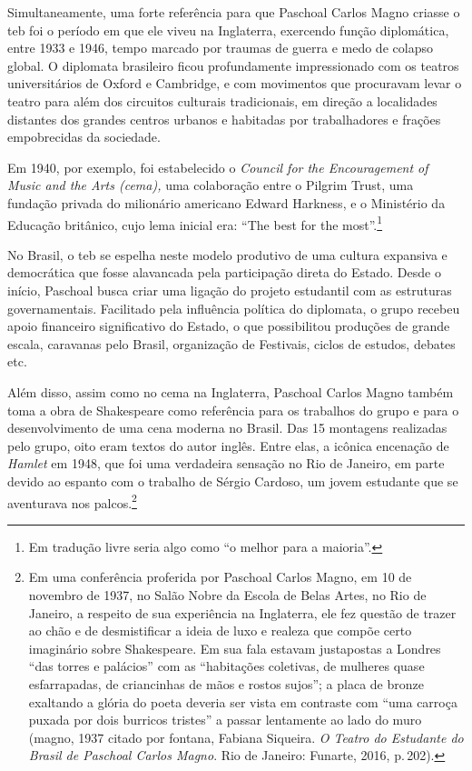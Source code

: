 Simultaneamente, uma forte referência para que Paschoal Carlos Magno
criasse o {\sc teb} foi o período em que ele viveu na Inglaterra, exercendo
função diplomática, entre 1933 e 1946, tempo marcado por traumas de
guerra e medo de colapso global. O diplomata brasileiro ficou
profundamente impressionado com os teatros universitários de Oxford e
Cambridge, e com movimentos que procuravam levar o teatro para além dos
circuitos culturais tradicionais, em direção a localidades distantes dos
grandes centros urbanos e habitadas por trabalhadores e frações
empobrecidas da sociedade.

Em 1940, por exemplo, foi estabelecido o {\it Council for the
Encouragement of Music and the Arts ({\sc cema}),} uma colaboração entre o
Pilgrim Trust, uma fundação privada do milionário americano Edward
Harkness, e o Ministério da Educação britânico, cujo lema inicial era:
“The best for the most”.\footnote{Em tradução livre seria algo como “o
  melhor para a maioria”.}

No Brasil, o {\sc teb} se espelha neste modelo produtivo de uma cultura
expansiva e democrática que fosse alavancada pela participação direta do
Estado. Desde o início, Paschoal busca criar uma ligação do projeto
estudantil com as estruturas governamentais. Facilitado pela influência
política do diplomata, o grupo recebeu apoio financeiro significativo do
Estado, o que possibilitou produções de grande escala, caravanas pelo
Brasil, organização de Festivais, ciclos de estudos, debates etc.

Além disso, assim como no {\sc cema} na Inglaterra, Paschoal Carlos Magno
também toma a obra de Shakespeare como referência para os trabalhos do
grupo e para o desenvolvimento de uma cena moderna no Brasil. Das 15
montagens realizadas pelo grupo, oito eram textos do autor inglês. Entre
elas, a icônica encenação de {\it Hamlet} em 1948, que foi uma
verdadeira sensação no Rio de Janeiro, em parte devido ao espanto com o
trabalho de Sérgio Cardoso, um jovem estudante que se aventurava nos
palcos.\footnote{Em uma conferência proferida por Paschoal Carlos Magno,
  em 10 de novembro de 1937, no Salão Nobre da Escola de Belas Artes, no
  Rio de Janeiro, a respeito de sua experiência na Inglaterra, ele fez
  questão de trazer ao chão e de desmistificar a ideia de luxo e realeza
  que compõe certo imaginário sobre Shakespeare. Em sua fala estavam
  justapostas a Londres “das torres e palácios” com as “habitações
  coletivas, de mulheres quase esfarrapadas, de criancinhas de mãos e
  rostos sujos”; a placa de bronze exaltando a glória do poeta deveria
  ser vista em contraste com “uma carroça puxada por dois burricos
  tristes” a passar lentamente ao lado do muro ({\sc magno}, 1937 citado por
  {\sc fontana}, Fabiana Siqueira. {\it O Teatro do Estudante do Brasil de
  Paschoal Carlos Magno}. Rio de Janeiro: Funarte, 2016, p.\,202).}


